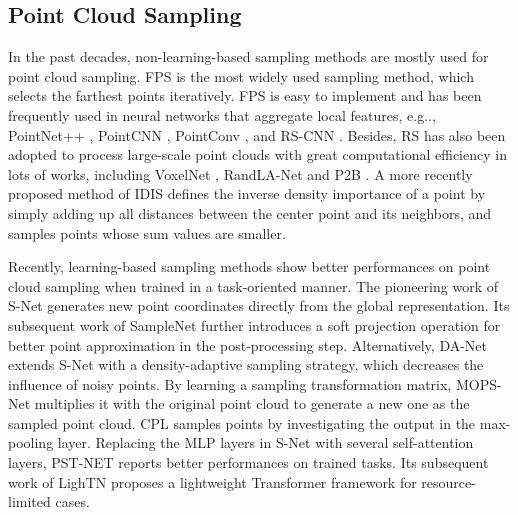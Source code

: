 \documentclass[10pt,twocolumn,letterpaper]{article}
\makeatletter
\DeclareRobustCommand\onedot{\futurelet\@let@token\@onedot}
\def\@onedot{\ifx\@let@token.\else.\null\fi\xspace}
\def\eg{e.g\onedot} \def\Eg{E.g\onedot}
\makeatother
\begin{document}
\subsection{Point Cloud Sampling}
In the past decades, non-learning-based sampling methods are mostly used for point cloud sampling.
FPS \cite{Eldar1994TheFP, Moenning2003FastMF} is the most widely used sampling method, which selects the farthest points iteratively. FPS is easy to implement and has been frequently used in neural networks that aggregate local features, \eg, PointNet++ \cite{Qi2017PointNetDH}, PointCNN \cite{Li2018PointCNNCO}, PointConv \cite{Wu2019PointConvDC}, and RS-CNN \cite{Liu2019RelationShapeCN}. Besides, RS has also been adopted to process large-scale point clouds with great computational efficiency in lots of works, including VoxelNet \cite{Zhou2018VoxelNetEL}, RandLA-Net \cite{Hu2020RandLANetES} and P2B \cite{Qi2020P2BPN}. A more recently proposed method of IDIS \cite{Groh2018FlexConvolutionM} defines the inverse density importance of a point by simply adding up all distances between the center point and its neighbors, and samples points whose sum values are smaller.

Recently, learning-based sampling methods show better performances on point cloud sampling when trained in a task-oriented manner. The pioneering work of S-Net \cite{Dovrat2019LearningTS} generates new point coordinates directly from the global representation. Its subsequent work of SampleNet \cite{Lang2020SampleNetDP} further introduces a soft projection operation for better point approximation in the post-processing step. Alternatively, DA-Net \cite{Lin2021DANetDD} extends S-Net with a density-adaptive sampling strategy, which decreases the influence of noisy points.
By learning a sampling transformation matrix, MOPS-Net \cite{Qian2020MOPSNetAM} multiplies it with the original point cloud to generate a new one as the sampled point cloud. 
CPL \cite{Nezhadarya2020AdaptiveHD} samples points by investigating the output in the max-pooling layer.
Replacing the MLP layers in S-Net with several self-attention layers, PST-NET \cite{Wang2021PSTNETPC} reports better performances on trained tasks. Its subsequent work of LighTN \cite{Wang2022LighTNLT} proposes a lightweight Transformer framework for resource-limited cases.
\end{document}
